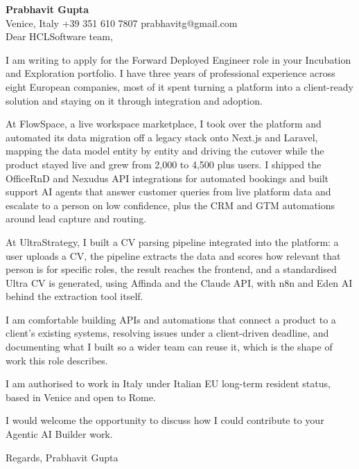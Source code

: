 \documentclass[a4paper,10.5pt]{article}
\begin{document}
\textbf{Prabhavit Gupta}\\
Venice, Italy \textbar{} +39 351 610 7807 \textbar{} prabhavitg@gmail.com\\[10pt]
Dear HCLSoftware team,

I am writing to apply for the Forward Deployed Engineer role in your Incubation and Exploration portfolio. I have three years of professional experience across eight European companies, most of it spent turning a platform into a client-ready solution and staying on it through integration and adoption.

At FlowSpace, a live workspace marketplace, I took over the platform and automated its data migration off a legacy stack onto Next.js and Laravel, mapping the data model entity by entity and driving the cutover while the product stayed live and grew from 2,000 to 4,500 plus users. I shipped the OfficeRnD and Nexudus API integrations for automated bookings and built support AI agents that answer customer queries from live platform data and escalate to a person on low confidence, plus the CRM and GTM automations around lead capture and routing.

At UltraStrategy, I built a CV parsing pipeline integrated into the platform: a user uploads a CV, the pipeline extracts the data and scores how relevant that person is for specific roles, the result reaches the frontend, and a standardised Ultra CV is generated, using Affinda and the Claude API, with n8n and Eden AI behind the extraction tool itself.

I am comfortable building APIs and automations that connect a product to a client's existing systems, resolving issues under a client-driven deadline, and documenting what I built so a wider team can reuse it, which is the shape of work this role describes.

I am authorised to work in Italy under Italian EU long-term resident status, based in Venice and open to Rome.

I would welcome the opportunity to discuss how I could contribute to your Agentic AI Builder work.

Regards,
Prabhavit Gupta
\end{document}
